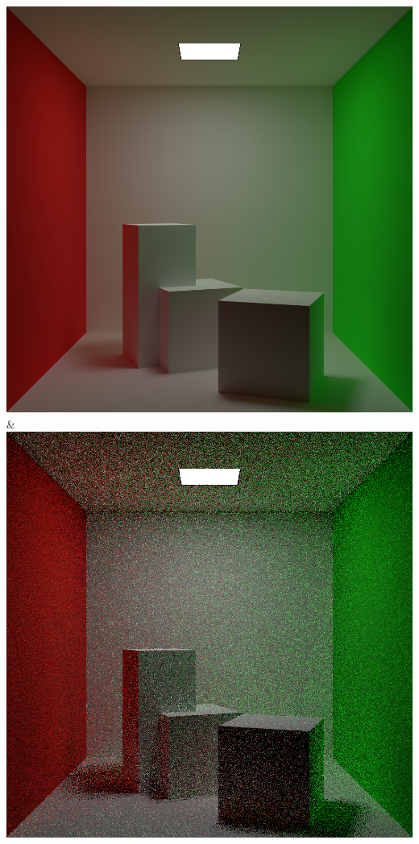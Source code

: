 \includegraphics[width=\linewidth]{figures/py/tests/path_termination/ref_1min.png}
& \includegraphics[width=\linewidth]{figures/py/tests/path_termination/ref_1spp.png}
